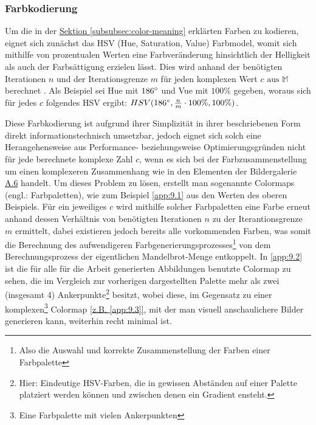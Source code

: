 \subsubsection{Farbkodierung}\label{subsubsec:color-coding}

Um die in der \hyperref[subsubsec:color-meaning]{Sektion \ref{subsubsec:color-meaning}}
erklärten Farben zu kodieren, eignet sich zunächst das HSV (Hue, Saturation, Value)
Farbmodel, womit sich mithilfe von prozentualen Werten eine
Farbveränderung hinsichtlich der Helligkeit als auch der Farbsättigung erzielen lässt.
Dies wird anhand der benötigten Iterationen $n$ und der Iterationsgrenze $m$
für jeden komplexen Wert $c \text{ aus } \mathbb{M}$
berechnet \cite{robert_p_color_2022}.
Als Beispiel sei Hue mit $186\degree$ und Vue mit $100\%$ gegeben, woraus
sich für jedes $c$ folgendes HSV ergibt:
$ HSV(186\degree, \frac{n}{m} \cdot 100\%, 100\%)$.

Diese Farbkodierung ist aufgrund ihrer Simplizität in ihrer beschriebenen
Form direkt informationstechnisch umsetzbar, jedoch eignet sich solch eine
Herangehensweise aus Performance- beziehungsweise Optimierungsgründen nicht
für jede berechnete komplexe Zahl $c$, wenn es sich bei der
Farbzusammenstellung um einen komplexeren Zusammenhang wie in den Elementen
der Bildergalerie \hyperref[app:6]{A.6} handelt.
Um dieses Problem zu lösen, erstellt man sogenannte Colormaps
(engl.: Farbpaletten), wie zum Beispiel \hyperref[app:9.1]{\ref{app:9.1}}
aus den Werten des oberen Beispiels.
Für ein jeweiliges $c$ wird mithilfe solcher Farbpaletten eine Farbe erneut anhand
dessen Verhältnis von benötigten Iterationen $n$ zu der Iterantionsgrenze $m$
ermittelt, dabei existieren jedoch bereits alle vorkommenden Farben, was somit
die Berechnung des aufwendigeren Farbgenerierungsprozesses\footnote{
  Also die Auswahl und korrekte Zusammenstellung der Farben einer Farbpalette
}
von dem Berechnungsprozess der eigentlichen Mandelbrot-Menge entkoppelt.
In \hyperref[app:9.2]{\ref{app:9.2}} ist die für alle für die Arbeit generierten
Abbildungen benutzte Colormap zu sehen, die im Vergleich zur vorherigen
dargestellten Palette mehr als zwei (insgesamt 4) Ankerpunkte\footnote{
  Hier: Eindeutige HSV-Farben, die in gewissen Abständen auf einer Palette
  platziert werden können und zwischen denen ein Gradient ensteht.
} besitzt, wobei diese, im Gegensatz zu einer komplexen\footnote{
  Eine Farbpalette mit vielen Ankerpunkten
} Colormap \hyperref[app:9.3]{[z.B. \ref{app:9.3}]},
mit der man visuell anschaulichere Bilder generieren kann,
weiterhin recht minimal ist.